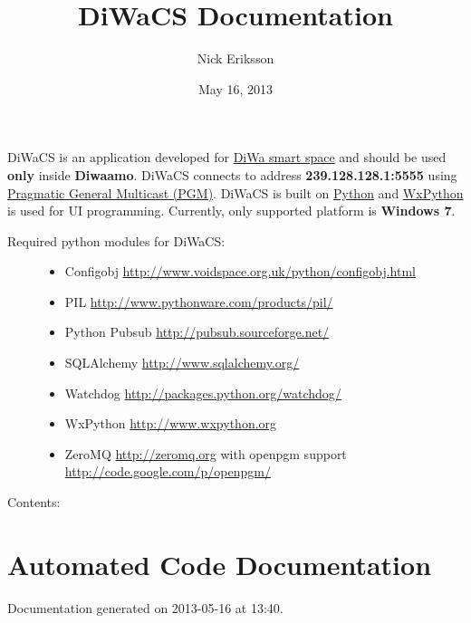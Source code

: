 \documentclass[letterpaper,10pt,english]{sphinxmanual}
\title{DiWaCS Documentation}
\date{May 16, 2013}
\author{Nick Eriksson}
\begin{document}
\maketitle
\tableofcontents
{}\label{index::doc}


DiWaCS is an application developed for \href{https://cse.aalto.fi/research/groups/stratus/research/research-projects/}{DiWa smart space} and should be used \textbf{only} inside \textbf{Diwaamo}. DiWaCS connects to address \textbf{239.128.128.1:5555} using \href{http://code.google.com/p/openpgm/}{Pragmatic General Multicast (PGM)}. DiWaCS is built on \href{http://www.python.org}{Python} and \href{http://www.wxpython.org}{WxPython} is used for UI programming. Currently, only supported platform is \textbf{Windows 7}.
\begin{description}
\item[{Required python modules for DiWaCS:}] \leavevmode\begin{itemize}
\item {} 
Configobj \href{http://www.voidspace.org.uk/python/configobj.html}{http://www.voidspace.org.uk/python/configobj.html}

\item {} 
PIL \href{http://www.pythonware.com/products/pil/}{http://www.pythonware.com/products/pil/}

\item {} 
Python Pubsub \href{http://pubsub.sourceforge.net/}{http://pubsub.sourceforge.net/}

\item {} 
SQLAlchemy \href{http://www.sqlalchemy.org/}{http://www.sqlalchemy.org/}

\item {} 
Watchdog  \href{http://packages.python.org/watchdog/}{http://packages.python.org/watchdog/}

\item {} 
WxPython \href{http://www.wxpython.org}{http://www.wxpython.org}

\item {} 
ZeroMQ \href{http://zeromq.org}{http://zeromq.org} with openpgm support \href{http://code.google.com/p/openpgm/}{http://code.google.com/p/openpgm/}

\end{itemize}

\end{description}

Contents:


\chapter{Automated Code Documentation}
\label{api:automated-code-documentation}\label{api::doc}\label{api:welcome-to-diwacs-documentation}
Documentation generated on 2013-05-16 at 13:40.
\end{document}
